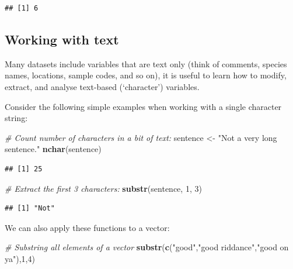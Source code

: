 \documentclass[]{book}
\newenvironment{Shaded}{\begin{snugshade}}{\end{snugshade}}
\newcommand{\CommentTok}[1]{\textcolor[rgb]{0.56,0.35,0.01}{\textit{#1}}}
\newcommand{\DecValTok}[1]{\textcolor[rgb]{0.00,0.00,0.81}{#1}}
\newcommand{\KeywordTok}[1]{\textcolor[rgb]{0.13,0.29,0.53}{\textbf{#1}}}
\newcommand{\NormalTok}[1]{#1}
\newcommand{\StringTok}[1]{\textcolor[rgb]{0.31,0.60,0.02}{#1}}
\begin{document}
\begin{verbatim}
## [1] 6
\end{verbatim}

\hypertarget{workingtext}{%
\subsection{Working with text}\label{workingtext}}

Many datasets include variables that are text only (think of comments, species names, locations, sample codes, and so on), it is useful to learn how to modify, extract, and analyse text-based (`character') variables.

Consider the following simple examples when working with a single character string:

\begin{Shaded}
\begin{Highlighting}[]
\CommentTok{# Count number of characters in a bit of text:}
\NormalTok{sentence <-}\StringTok{ "Not a very long sentence."}
\KeywordTok{nchar}\NormalTok{(sentence)}
\end{Highlighting}
\end{Shaded}

\begin{verbatim}
## [1] 25
\end{verbatim}

\begin{Shaded}
\begin{Highlighting}[]
\CommentTok{# Extract the first 3 characters:}
\KeywordTok{substr}\NormalTok{(sentence, }\DecValTok{1}\NormalTok{, }\DecValTok{3}\NormalTok{)}
\end{Highlighting}
\end{Shaded}

\begin{verbatim}
## [1] "Not"
\end{verbatim}

We can also apply these functions to a vector:

\begin{Shaded}
\begin{Highlighting}[]
\CommentTok{# Substring all elements of a vector}
\KeywordTok{substr}\NormalTok{(}\KeywordTok{c}\NormalTok{(}\StringTok{"good"}\NormalTok{,}\StringTok{"good riddance"}\NormalTok{,}\StringTok{"good on ya"}\NormalTok{),}\DecValTok{1}\NormalTok{,}\DecValTok{4}\NormalTok{)}
\end{Highlighting}
\end{Shaded}
\end{document}
